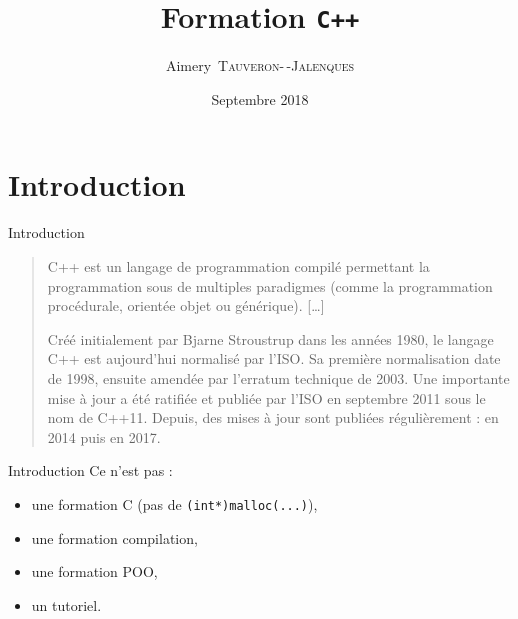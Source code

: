 \documentclass{beamer}
\title{Formation \texttt{C++}}
\date{Septembre 2018}
\author[A.~\textsc{Tauveron}]{Aimery~\textsc{Tauveron-\,-Jalenques}}
\institute{\href{https://viarezo.fr/}{ViaRézo}}
\numberwithin{equation}{section}
\begin{document}
\lstset{breaklines=true, showstringspaces=false}
\lstset{language=[11]C++}

\frame{\titlepage}


\section*{Introduction}
\label{sec:introduction}
\begin{frame}{Introduction}
  \begin{quotation}
    C++ est un langage de programmation compilé permettant la programmation sous de multiples paradigmes (comme la programmation procédurale, orientée objet ou générique). [\dots{}]

    Créé initialement par Bjarne Stroustrup dans les années 1980, le langage C++ est aujourd'hui normalisé par l'ISO. Sa première normalisation date de 1998, ensuite amendée par l'erratum technique de 2003. Une importante mise à jour a été ratifiée et publiée par l'ISO en septembre 2011 sous le nom de C++11. Depuis, des mises à jour sont publiées régulièrement : en 2014 puis en 2017.
  \end{quotation}

\end{frame}

\begin{frame}{Introduction}
  Ce n'est pas :
  \begin{itemize}
  \item une formation C (pas de \texttt{(int*)malloc(...)}),
  \item une formation compilation,
  \item une formation POO,
  \item un tutoriel.
  \end{itemize}
\end{frame}


\frame{\tableofcontents}
\end{document}
